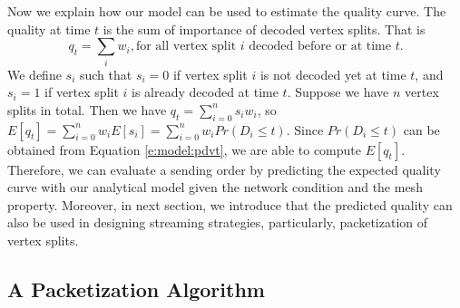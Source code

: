 
    Now we explain how our model can be used to estimate the quality 
    curve. The quality at time $t$ is the sum of importance of 
    decoded vertex splits. That is
    \begin{displaymath}
    q_t =  \sum_i w_i, \textrm{for all vertex split $i$ decoded before or at time $t$}.
    \end{displaymath}
    We define $s_i$ such that
    $s_i = 0$ if vertex split $i$ is not decoded yet at time $t$, and
    $s_i = 1$ if vertex split $i$ is already decoded at time $t$.
    Suppose we have $n$ vertex splits in total.
    Then we have
    $q_t    = \sum_{i=0}^{n}s_{i}w_{i}$, so
    $E[q_t] = \sum_{i=0}^{n}w_{i}E[s_{i}] = \sum_{i=0}^{n}w_{i}Pr(D_i \leq t)$.
    Since $Pr(D_i \leq t)$ can be obtained from Equation \ref{e:model:pdvt}, we are able to compute $E[q_t]$. 
    Therefore, we can evaluate a sending order by predicting the expected
    quality curve with our analytical model given the network condition
    and the mesh property. Moreover, in next section, we introduce that
    the predicted quality can also be used in designing streaming strategies, 
    particularly, packetization of vertex splits.

\subsection{A Packetization Algorithm}
\label{s:model:scheduling}


